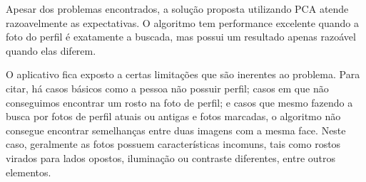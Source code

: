 \documentclass[10pt,a4paper]{article}
\begin{document}
Apesar dos problemas encontrados, a solução proposta utilizando PCA
atende razoavelmente as expectativas. O algoritmo tem performance
excelente quando a foto do perfil é exatamente a buscada, mas possui
um resultado apenas razoável quando elas diferem.

O aplicativo fica exposto a certas limitações que são
inerentes ao problema. Para citar, há casos básicos como a
pessoa não possuir perfil; casos em que não conseguimos
encontrar um rosto na foto de perfil; e casos que mesmo
fazendo a busca por fotos de perfil atuais ou antigas e fotos
marcadas, o algoritmo não consegue encontrar semelhanças entre
duas imagens com a mesma face. Neste caso, geralmente as fotos
possuem características incomuns, tais como rostos virados
para lados opostos, iluminação ou contraste diferentes, 
entre outros elementos.

\begin{small}
  
\end{small}
\end{document}
